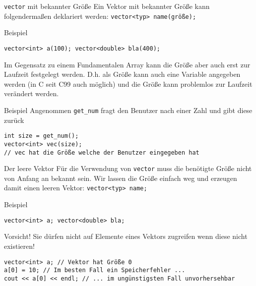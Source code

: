 \documentclass[presentation]{beamer}
\begin{document}
\begin{frame}[label={sec:orgf674a05},fragile]{{\color{solarizedYellow}\texttt{vector}} mit bekannter Größe}
 Ein Vektor mit bekannter Größe kann folgendermaßen deklariert werden: {\color{solarizedYellow}\verb!vector<typ> name(größe);!}
\begin{exampleblock}{Beispiel}
\begin{verbatim}
vector<int> a(100); vector<double> bla(400);
\end{verbatim}
\end{exampleblock}
Im Gegensatz zu einem Fundamentalen Array kann die Größe aber auch
erst \alert{zur Laufzeit} festgelegt werden. D.h. \alert{als Größe kann auch eine
Variable} angegeben werden (in C seit C99 auch möglich) und die
\alert{Größe} kann problemlos \alert{zur Laufzeit verändert werden}.
\begin{exampleblock}{Beispiel}
Angenommen {\color{solarizedYellow}\verb!get_num!} fragt den Benutzer nach einer Zahl und gibt
diese zurück
\begin{verbatim}
int size = get_num();
vector<int> vec(size);
// vec hat die Größe welche der Benutzer eingegeben hat
\end{verbatim}
\end{exampleblock}
\end{frame}
\begin{frame}[label={sec:org3428293},fragile]{Der leere Vektor}
 Für die Verwendung von {\color{solarizedYellow}\verb!vector!} muss die benötigte \alert{Größe nicht von
Anfang an bekannt sein}. Wir lassen die Größe einfach weg und erzeugen
damit einen leeren Vektor: {\color{solarizedYellow}\verb!vector<typ> name;!}
\begin{exampleblock}{Beispiel}
\begin{verbatim}
vector<int> a; vector<double> bla;
\end{verbatim}
\end{exampleblock}
\begin{alertblock}{Vorsicht!}
Sie dürfen nicht auf Elemente eines Vektors zugreifen wenn diese nicht
existieren!
\begin{verbatim}
vector<int> a; // Vektor hat Größe 0
a[0] = 10; // Im besten Fall ein Speicherfehler ...
cout << a[0] << endl; // ... im ungünstigsten Fall unvorhersehbar
\end{verbatim}
\end{alertblock}
\end{frame}
\end{document}
